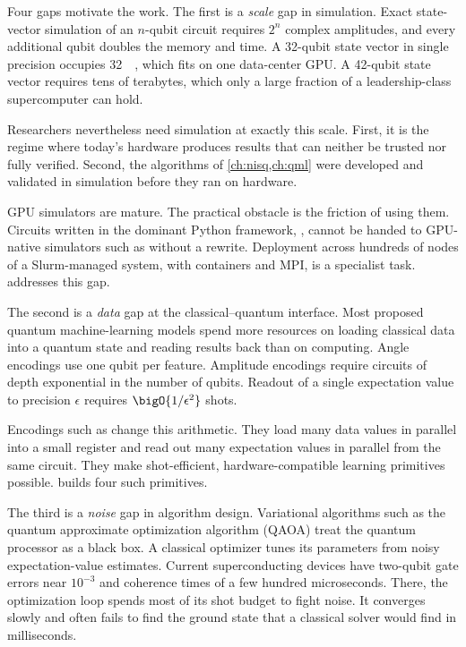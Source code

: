 Four gaps motivate the work. The first is a \emph{scale} gap in simulation. Exact state-vector simulation of an $n$-qubit circuit requires $2^{n}$ complex amplitudes, and every additional qubit doubles the memory and time. A 32-qubit state vector in single precision occupies \SI{32}{\gibi\byte}, which fits on one data-center GPU. A 42-qubit state vector requires tens of terabytes, which only a large fraction of a leadership-class supercomputer can hold.

Researchers nevertheless need simulation at exactly this scale. First, it is the regime where today's hardware produces results that can neither be trusted nor fully verified. Second, the algorithms of \cref{ch:nisq,ch:qml} were developed and validated in simulation before they ran on hardware.

GPU simulators are mature. The practical obstacle is the friction of using them. Circuits written in the dominant Python framework, \qiskit, cannot be handed to GPU-native simulators such as \cudaq{} without a rewrite. Deployment across hundreds of nodes of a Slurm-managed system, with containers and MPI, is a specialist task.  addresses this gap.

The second is a \emph{data} gap at the classical--quantum interface. Most proposed quantum machine-learning models spend more resources on loading classical data into a quantum state and reading results back than on computing. Angle encodings use one qubit per feature. Amplitude encodings require circuits of depth exponential in the number of qubits. Readout of a single expectation value to precision $\epsilon$ requires $\bigO{1/\epsilon^{2}}$ shots.

Encodings such as \qcrank{} change this arithmetic. They load many data values in parallel into a small register and read out many expectation values in parallel from the same circuit. They make shot-efficient, hardware-compatible learning primitives possible.  builds four such primitives.

The third is a \emph{noise} gap in algorithm design. Variational algorithms such as the quantum approximate optimization algorithm (QAOA) treat the quantum processor as a black box. A classical optimizer tunes its parameters from noisy expectation-value estimates. Current superconducting devices have two-qubit gate errors near $10^{-3}$ and coherence times of a few hundred microseconds. There, the optimization loop spends most of its shot budget to fight noise. It converges slowly and often fails to find the ground state that a classical solver would find in milliseconds.


